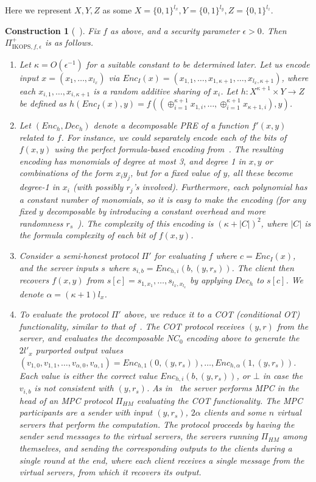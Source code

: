 \documentclass[a4paper]{article}
\newtheorem{construction}{Construction}
\begin{document}
Here we represent  $X,Y,Z$ as some $X=\{0,1\}^{l_x},Y=\{0,1\}^{l_y},Z=\{0,1\}^{l_z}$. 
\begin{construction}[~\cite{IKOPS11}]\label{con-ikops+} 
	Fix $f$ as above, and a security parameter $\epsilon>0$. 
	Then $\Pi^+_{\text{IKOPS},f,\epsilon}$ is as follows.
	\begin{enumerate}	
	\item Let $\kappa=O(\epsilon^{-1})$ for a suitable constant to be determined later.
	 Let us encode input $x=(x_1,\ldots,x_{l_x})$ via
	$Enc_I(x)=(x_{1,1},\ldots,x_{1,\kappa+1},\ldots,x_{l_x,\kappa+1})$, where each $x_{i,1},\ldots,x_{i,\kappa+1}$ is a random additive sharing of $x_i$. Let $h:X^{\kappa+1}\times Y\rightarrow Z$ be defined as $h(Enc_I(x),y)=f((\oplus^{\kappa+1}_{i=1}x_{1,i},\ldots,\oplus^{\kappa+1}_{i=1}x_{\kappa+1,i}),y)$. 
	\item Let $(Enc_h,Dec_h)$ denote a decomposable PRE of a function $f'(x,y)$ related to $f$. For instance, we could separately encode each of the bits of $f(x,y)$ using the perfect formula-based encoding from~\cite{IK02}.
	The resulting encoding has monomials of degree at most 3, and degree 1 in $x,y$ or combinations of the form $x_iy_j$, but for a fixed value of $y$, all these become degree-1 in $x_i$ (with possibly $r_j$'s involved). Furthermore, each polynomial has a constant number of monomials, so it is easy to make the encoding (for any fixed $y$ decomposable by introducing a constant overhead and more randomness $r_s$~\cite{}). The complexity of this encoding is $(\kappa+|C|)^2$, where $|C|$ is the formula complexity of each bit of $f(x,y)$.
	\item Consider a semi-honest protocol $\Pi'$ for evaluating $f$ where $c=Enc_I(x)$, and the server inputs $s$ where $s_{i,b}=Enc_{h,i}(b,(y,r_s))$. The client then recovers $f(x,y)$ from
	$s[c]=s_{1,x_1},\ldots,s_{l_x,x_{l_x}}$ by applying $Dec_h$ to $s[c]$.
	We denote $\alpha=(\kappa+1)l_x$.%
	\item To evaluate the protocol $\Pi'$ above, we reduce it to a COT (conditional OT) functionality, similar to that of~\cite{IKOPS11}. The COT protocol receives $(y,r)$ from the server, and evaluates the decomposable $NC_0$ encoding above to generate the $2l'_x$ purported output values 
	$(v_{1,0},v_{1,1},\ldots,v_{\alpha,0},v_{\alpha,1})=Enc_{h,1}(0,(y,r_s)),\ldots,Enc_{h,\alpha}(1,(y,r_s))$.   
	Each value is either the correct value $Enc_{h,i}(b,(y,r_s))$, or $\bot$ in case the $v_{i,b}$ is not consistent with $(y,r_s)$.
	As in~\cite{IKOPS11} the server performs MPC in the head 
	of an MPC protocol $\Pi_{HM}$ evaluating the COT functionality.
	The MPC participants are a sender with input $(y,r_s)$, $2\alpha$ clients and some $n$ virtual servers that perform the computation. The protocol proceeds by having the sender send messages to the virtual servers, the servers running $\Pi_{HM}$ among themselves, and sending the corresponding outputs to the clients during a single round at the end, where each client receives a single message from the virtual servers, from which it recovers its output.
	

\end{enumerate}
\end{construction}
\end{document}
